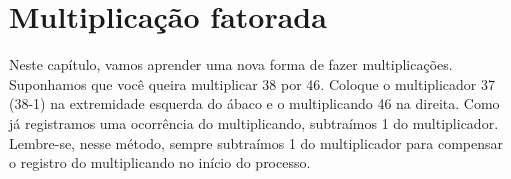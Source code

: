 \documentclass[12pt]{book}
\begin{document}
\vspace{0.2cm}
\begin{minipage}{0.5\textwidth}
\end{minipage}%
%
\begin{minipage}{0.4\textwidth}
\end{minipage}

\chapter{Multiplicação fatorada}
Neste capítulo, vamos aprender uma nova
forma de fazer multiplicações. Suponhamos
que você queira multiplicar 38 por 46.
Coloque o multiplicador 37 (38-1) na
extremidade esquerda
do ábaco e o multiplicando 46 na direita. 
Como já registramos uma ocorrência do
multiplicando, subtraímos 1 do multiplicador.
Lembre-se, nesse método, sempre subtraímos
1 do multiplicador para compensar o registro
do multiplicando no início do processo.
\end{document}
